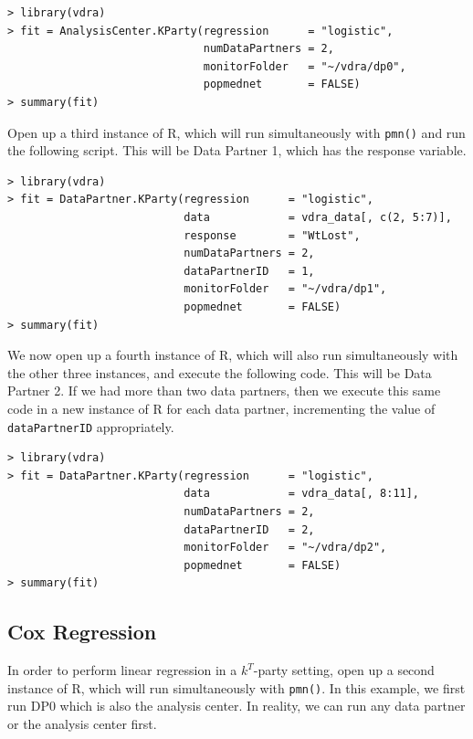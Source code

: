 \documentclass[12]{article}
\begin{document}
\begin{verbatim}
> library(vdra)
> fit = AnalysisCenter.KParty(regression      = "logistic",
                              numDataPartners = 2,
                              monitorFolder   = "~/vdra/dp0",
                              popmednet       = FALSE)
> summary(fit)
\end{verbatim}

Open up a third instance of R, which will run simultaneously with \verb"pmn()" and run the following script.  This will be Data Partner 1, which has the response variable.

\begin{verbatim}
> library(vdra)
> fit = DataPartner.KParty(regression      = "logistic",
                           data            = vdra_data[, c(2, 5:7)],
                           response        = "WtLost",
                           numDataPartners = 2,
                           dataPartnerID   = 1,
                           monitorFolder   = "~/vdra/dp1",
                           popmednet       = FALSE)
> summary(fit)
\end{verbatim}

We now open up a fourth instance of R, which will also run simultaneously with the other three instances, and execute the following code.  This will be Data Partner 2.   If we had more than two data partners, then we execute this same code in a new instance of R for each data partner, incrementing the value of \verb"dataPartnerID" appropriately.

\begin{verbatim}
> library(vdra)
> fit = DataPartner.KParty(regression      = "logistic",
                           data            = vdra_data[, 8:11],
                           numDataPartners = 2,
                           dataPartnerID   = 2,
                           monitorFolder   = "~/vdra/dp2",
                           popmednet       = FALSE)
> summary(fit)
\end{verbatim}

\subsection{Cox Regression}

In order to perform linear regression in a $k^T$-party setting, open up a second instance of R, which will run simultaneously with \verb"pmn()".  In this example, we first run DP0 which is also the analysis center.  In reality, we can run any data partner or the analysis center first.
\end{document}
